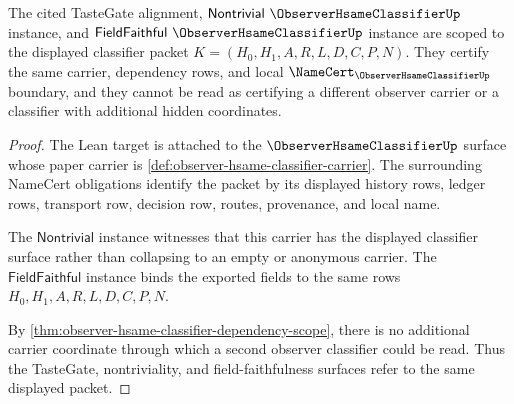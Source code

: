 \begin{theorem}
\label{thm:observer-hsame-classifier-tastegate-carrier-scope}
The cited TasteGate alignment, $\mathsf{Nontrivial}\ \ObserverHsameClassifierUp$ instance, and $\mathsf{FieldFaithful}\ \ObserverHsameClassifierUp$ instance are scoped to the displayed classifier packet $K=(H_0,H_1,A,R,L,D,C,P,N)$. They certify the same carrier, dependency rows, and local $\NameCert_{\ObserverHsameClassifierUp}$ boundary, and they cannot be read as certifying a different observer carrier or a classifier with additional hidden coordinates.
\end{theorem}
\begin{proof}
The Lean target is attached to the $\ObserverHsameClassifierUp$ surface whose paper carrier is \autoref{def:observer-hsame-classifier-carrier}. The surrounding NameCert obligations identify the packet by its displayed history rows, ledger rows, transport row, decision row, routes, provenance, and local name.

The $\mathsf{Nontrivial}$ instance witnesses that this carrier has the displayed classifier surface rather than collapsing to an empty or anonymous carrier. The $\mathsf{FieldFaithful}$ instance binds the exported fields to the same rows $H_0,H_1,A,R,L,D,C,P,N$.

By \autoref{thm:observer-hsame-classifier-dependency-scope}, there is no additional carrier coordinate through which a second observer classifier could be read. Thus the TasteGate, nontriviality, and field-faithfulness surfaces refer to the same displayed packet.
\end{proof}

